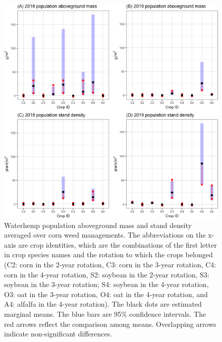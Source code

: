 \documentclass[
]{article}
\begin{document}
\begin{figure}
\centering
\includegraphics{Population-sex-biom-dens_files/figure-latex/pop-biom-dens-all-1.png}
\caption{\label{fig:pop-biom-dens-all}Waterhemp population aboveground mass and stand density averaged over corn weed managements. The abbreviations on the x-axis are crop identities, which are the combinations of the first letter in crop species names and the rotation to which the crops belonged (C2: corn in the 2-year rotation, C3: corn in the 3-year rotation, C4: corn in the 4-year rotation, S2: soybean in the 2-year rotation, S3: soybean in the 3-year rotation; S4: soybean in the 4-year rotation, O3: oat in the 3-year rotation, O4: oat in the 4-year rotation, and A4: alfalfa in the 4-year rotation). The black dots are estimated marginal means. The blue bars are 95\% confidence intervals. The red arrows reflect the comparison among means. Overlapping arrows indicate non-significant differences.}
\end{figure}
\end{document}
